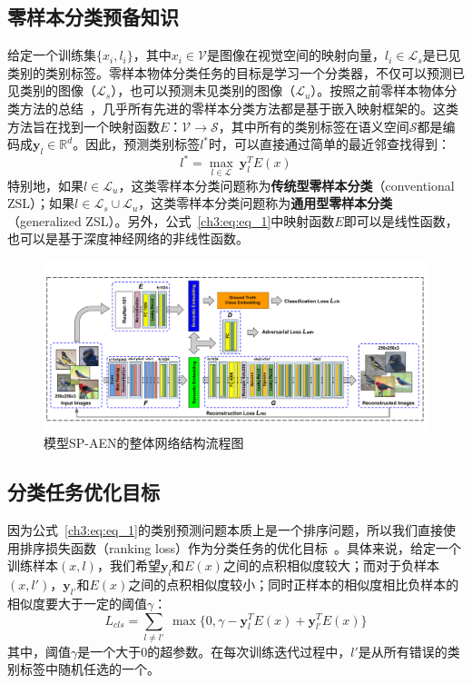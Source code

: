 \subsection{零样本分类预备知识}
给定一个训练集$\{x_i, l_i\}$，其中$x_i\in\mathcal{V}$是图像在视觉空间的映射向量，$l_i\in \mathcal{L}_s$是已见类别的类别标签。零样本物体分类任务的目标是学习一个分类器，不仅可以预测已见类别的图像（$\mathcal{L}_s$），也可以预测未见类别的图像（$\mathcal{L}_u$）。按照之前零样本物体分类方法的总结~\cite{xian2017zero,lei2015predicting}，几乎所有先进的零样本分类方法都是基于嵌入映射框架的。这类方法旨在找到一个映射函数$E$：$\mathcal{V}\rightarrow \mathcal{S}$，其中所有的类别标签在语义空间$\mathcal{S}$都是编码成$\bm{y}_l\in\mathbb{R}^d$。因此，预测类别标签$l^*$时，可以直接通过简单的最近邻查找得到：
\begin{equation}\label{ch3:eq:eq_1}
l^* = \max_{l\in\mathcal{L}}~\bm{y}^T_l E(x)
\end{equation}
特别地，如果$l\in\mathcal{L}_u$，这类零样本分类问题称为\textbf{传统型零样本分类}（conventional ZSL）；如果$l \in\mathcal{L}_s\cup \mathcal{L}_u$，这类零样本分类问题称为\textbf{通用型零样本分类}（generalized ZSL）。另外，公式~\eqref{ch3:eq:eq_1}中映射函数$E$即可以是线性函数，也可以是基于深度神经网络的非线性函数。


\begin{figure}[tbp]
    \centering
        \includegraphics[width=\linewidth]{chapter3/res/sp_aen.pdf}
    \caption{模型SP-AEN的整体网络结构流程图}
    \label{ch3:fig:sp_aen}
\end{figure}


\subsection{分类任务优化目标}
因为公式~\eqref{ch3:eq:eq_1}的类别预测问题本质上是一个排序问题，所以我们直接使用排序损失函数（ranking loss）作为分类任务的优化目标~\cite{frome2013devise,weston2010large}。具体来说，给定一个训练样本$(x, l)$，我们希望$\bm{y}_l$和$E(x)$之间的点积相似度较大；而对于负样本$(x,l')$，$\bm{y}_{l'}$和$E(x)$之间的点积相似度较小；同时正样本的相似度相比负样本的相似度要大于一定的阈值$\gamma$：
\begin{equation} \label{ch3:eq:eq_2}
L_{cls} = \sum\limits_{l\neq l'}~\max\{0, \gamma - \bm{y}_l^T E(x) + \bm{y}^T_{l'} E(x)\}
\end{equation}
其中，阈值$\gamma$是一个大于0的超参数。在每次训练迭代过程中，$l'$是从所有错误的类别标签中随机任选的一个。

